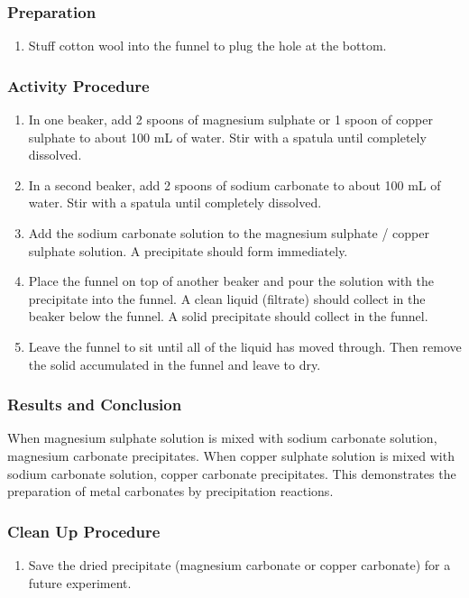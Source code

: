 \subsubsection*{Preparation}
\begin{enumerate}
\item{Stuff cotton wool into the funnel to plug the hole at the bottom.}
\end{enumerate}

\subsubsection*{Activity Procedure}
\begin{enumerate}
\item{In one beaker, add 2 spoons of magnesium sulphate or 1 spoon of copper sulphate to about 100 mL of water. Stir with a spatula until completely dissolved.}
\item{In a second beaker, add 2 spoons of sodium carbonate to about 100 mL of water. Stir with a spatula until completely dissolved.}
\item{Add the sodium carbonate solution to the magnesium sulphate / copper sulphate solution. A precipitate should form immediately.}
\item{Place the funnel on top of another beaker and pour the solution with the precipitate into the funnel. A clean liquid (filtrate) should collect in the beaker below the funnel. A solid precipitate should collect in the funnel.}
\item{Leave the funnel to sit until all of the liquid has moved through. Then remove the solid accumulated in the funnel and leave to dry.}
\end{enumerate}

\subsubsection*{Results and Conclusion}
When magnesium sulphate solution is mixed with sodium carbonate solution, magnesium carbonate precipitates. When copper sulphate solution is mixed with sodium carbonate solution, copper carbonate precipitates. This demonstrates the preparation of metal carbonates by precipitation reactions.

\subsubsection*{Clean Up Procedure}
\begin{enumerate}
\item{Save the dried precipitate (magnesium carbonate or copper carbonate) for a future experiment.}
\end{enumerate}

